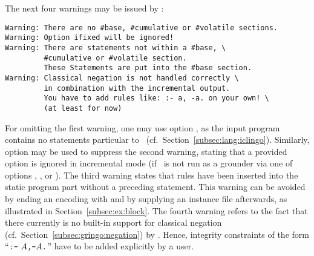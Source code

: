 The next four warnings may be issued by \iclingo:
\begin{lstlisting}[numbers=none,escapechar=@]
Warning: There are no #base, #cumulative or #volatile sections.
Warning: Option ifixed will be ignored!
Warning: There are statements not within a #base, \
         #cumulative or #volatile section.
         These Statements are put into the #base section.
Warning: Classical negation is not handled correctly \
         in combination with the incremental output.
         You have to add rules like: :- a, -a. on your own! \
         (at least for now)
\end{lstlisting}
%
For omitting the first warning, one may use option ,
as the input program contains no statements particular to \iclingo\
(cf.\ Section~\ref{subsec:lang:iclingo}).
Similarly, option  may be used to suppress the second warning,
stating that a provided option \code{--ifixed} is ignored in incremental mode
(if \iclingo\ is not run as a grounder 
 via one of options \code{--text}, , or ).
The third warning states that rules have been inserted into the static
program part without a 	preceding \const{\#base} statement.
This warning can be avoided by ending an encoding with 
and by supplying an instance file afterwards, as illustrated in Section~\ref{subsec:ex:block}.
The fourth warning refers to the fact that there currently is no
built-in support for classical negation (cf.\ Section~\ref{subsec:gringo:negation})
by \iclingo.
Hence, integrity constraints of the form ``$\texttt{:-}~A\texttt{,}\texttt{-}A\texttt{.}$''
have to be added explicitly by a user.


